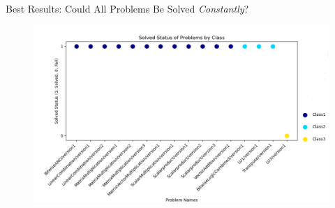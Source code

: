 \documentclass{beamer}
\begin{document}
\begin{frame}{Best Results: Could All Problems Be Solved \textit{Constantly}?}
    \begin{figure}
        \centering
        \includegraphics[height=0.8\textheight]{images/solved_status_graph.png}
    \end{figure}
\end{frame}
\end{document}
